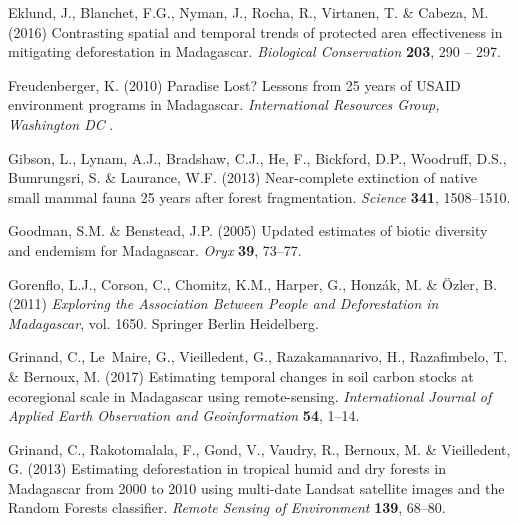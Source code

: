 \documentclass[a4paper, 12pt, leqno]{article}\usepackage[]{graphicx}\usepackage[]{color}
\begin{document}
\begin{thebibliography}{60}
Eklund, J., Blanchet, F.G., Nyman, J., Rocha, R., Virtanen, T. \& Cabeza, M.
  (2016) {Contrasting spatial and temporal trends of protected area
  effectiveness in mitigating deforestation in Madagascar}. \emph{Biological
  Conservation} \textbf{203}, 290 -- 297.

Freudenberger, K. (2010) {Paradise Lost? Lessons from 25 years of USAID
  environment programs in Madagascar}. \emph{International Resources Group,
  Washington DC} .

Gibson, L., Lynam, A.J., Bradshaw, C.J., He, F., Bickford, D.P., Woodruff,
  D.S., Bumrungsri, S. \& Laurance, W.F. (2013) Near-complete extinction of
  native small mammal fauna 25 years after forest fragmentation. \emph{Science}
  \textbf{341}, 1508--1510.

Goodman, S.M. \& Benstead, J.P. (2005) {Updated estimates of biotic diversity
  and endemism for Madagascar}. \emph{Oryx} \textbf{39}, 73--77.

Gorenflo, L.J., Corson, C., Chomitz, K.M., Harper, G., Honzák, M. \&
  {\"O}zler, B. (2011) \emph{{Exploring the Association Between People and
  Deforestation in Madagascar}}, vol. 1650. Springer Berlin Heidelberg.

Grinand, C., Le~Maire, G., Vieilledent, G., Razakamanarivo, H., Razafimbelo, T.
  \& Bernoux, M. (2017) {Estimating temporal changes in soil carbon stocks at
  ecoregional scale in Madagascar using remote-sensing}. \emph{International
  Journal of Applied Earth Observation and Geoinformation} \textbf{54}, 1--14.

Grinand, C., Rakotomalala, F., Gond, V., Vaudry, R., Bernoux, M. \&
  Vieilledent, G. (2013) {Estimating deforestation in tropical humid and dry
  forests in Madagascar from 2000 to 2010 using multi-date Landsat satellite
  images and the Random Forests classifier}. \emph{Remote Sensing of
  Environment} \textbf{139}, 68--80.


\end{thebibliography}
\end{document}
